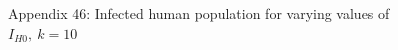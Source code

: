 \documentclass[
	12pt,				%
	oneside,			%
	a4paper,			%
	english,			%
	brazil				%
	]{abntex2}
\begin{document}
\begin{apendicesenv}
\begin{figure}[!ht]
	\caption*{Appendix 46: Infected human population for varying values of $I_{H0}, \ k=10$}
\end{figure}
\newpage





\end{apendicesenv}




\printindex
\end{document}
